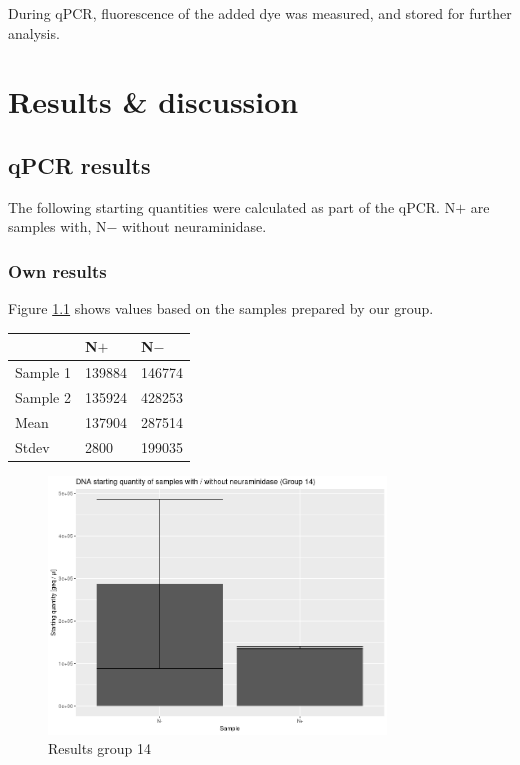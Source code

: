 \documentclass[a4paper,english]{scrreprt}
\begin{document}
During qPCR, fluorescence of the added dye was measured, and stored for
further analysis.

\chapter{Results \& discussion}

\section{qPCR results}

The following starting quantities were calculated as part of the qPCR. N$+$ are
samples with, N$-$ without neuraminidase.

\subsection{Own results}

Figure \ref{fig:sq_14} shows values based on the samples prepared by our group.
\\

\begin{tabu}{lll}
	\toprule
	& N$+$ & N$-$ \\
	\midrule
	Sample 1 & 139884 & 146774 \\
	Sample 2 & 135924 & 428253 \\
	Mean & 137904 & 287514 \\
	Stdev & 2800 & 199035 \\
	\bottomrule
\end{tabu}

\begin{figure}
	\centering
	\includegraphics[width=0.8\textwidth]{img/sq_group14.png}
	\caption{Results group 14}
	\label{fig:sq_14}
\end{figure}
\end{document}
